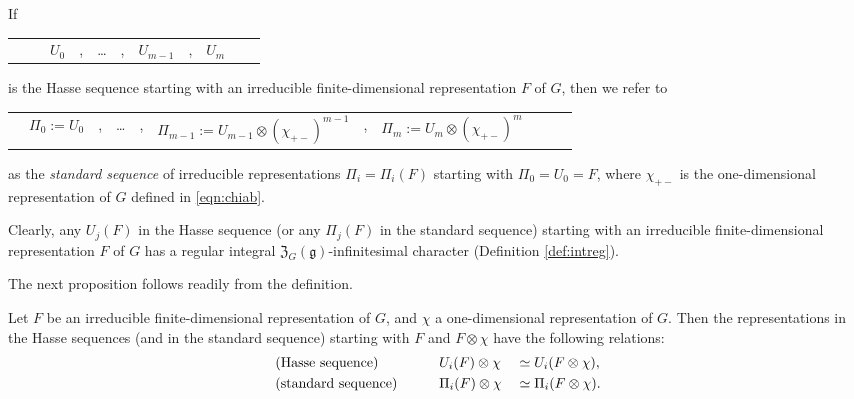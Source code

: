 \begin{definition}
\label{def:Hasse}
If 
\begin{center}
\begin{tabular}{ccccccccccc}
& &\ $U_0$&, &\dots   & , & $U_{m-1} $ &, & $U_{m}$ 
\end{tabular}
\end{center}
is the Hasse sequence
 starting with an irreducible finite-dimensional representation 
 $F$ of $G$, 
then we refer to 
\begin{center}
\begin{tabular}{ccccccccccc}
& ${\Pi}_0:=U_0$&, &\dots   & , 
& ${\Pi}_{m-1}:=U_{m-1}\otimes (\chi_{+-})^{m-1} $ &, 
& $\Pi_m:=U_{m}\otimes (\chi_{+-})^m$ 
\end{tabular}
\end{center}
as the
 {\it{standard sequence}}
 of irreducible representations 
${\Pi}_i={\Pi}_i(F)$
 starting with ${\Pi}_0=U_0=F$, 
 where $\chi_{+-}$  
 is the one-dimensional representation of $G$
 defined in \eqref{eqn:chiab}.  
\end{definition}

\begin{remark}
\label{rem:Hassereg}
Clearly,
 any $U_j(F)$ in the Hasse sequence
 (or any $\Pi_j(F)$ in the standard sequence)
 starting with an irreducible finite-dimensional representation $F$
 of $G$ has a regular integral ${\mathfrak{Z}}_G({\mathfrak{g}})$-infinitesimal character
 (Definition \ref{def:intreg}).  
\end{remark}



The next proposition follows readily from the definition.  
\begin{proposition}
\label{prop:HStensor}
Let $F$ be an irreducible finite-dimensional representation of $G$, 
 and $\chi$ a one-dimensional representation of $G$.  
Then the representations in the Hasse sequences 
 (and in the standard sequence)
 starting with $F$ and $F \otimes \chi$ have the following relations:
\begin{alignat*}{3}
&\text{\rm{(Hasse sequence)}}
\qquad
&&U_i(F) \otimes \chi &&\simeq U_i(F \otimes \chi), 
\\
&\text{\rm{(standard sequence)}}
\qquad
&&
\Pi_i(F) \otimes \chi &&\simeq \Pi_i(F \otimes \chi).  
\end{alignat*}
\end{proposition}

